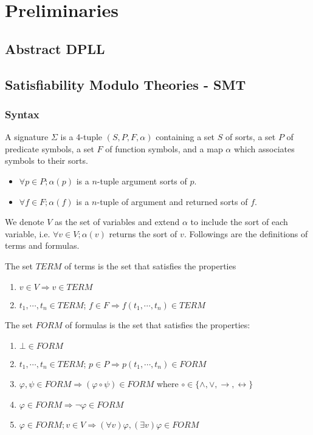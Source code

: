\chapter{Preliminaries}
\section{Abstract DPLL}


\section{Satisfiability Modulo Theories - SMT}
\subsection{Syntax} \label{subsection:smt-syntax}
\begin{definition}
A signature $\Sigma$ is a 4-tuple $(S, P, F, \alpha)$ containing a set $S$ of sorts, a set $P$ of predicate symbols, a set $F$ of function symbols, and a map $\alpha$ which associates symbols to their sorts.
\begin{itemize}
\item $\forall p \in P; \alpha(p)$ is a $n$-tuple argument sorts of $p$.
\item $\forall f \in F; \alpha(f)$ is a $n$-tuple of argument and returned sorts of $f$.
\end{itemize}
\end{definition}


We denote $V$ as the set of variables and extend $\alpha$ to include the sort of each variable, i.e. $\forall v \in V; \alpha(v)$ returns the sort of $v$. Followings are the definitions of terms and formulas.

\begin{definition}
The set $TERM$ of terms is the set that satisfies the properties
\begin{enumerate}
\item $v \in V \Rightarrow v \in TERM$
\item $t_1,\cdots,t_n \in TERM$; $f \in F \Rightarrow f(t_1,\cdots, t_n) \in TERM$
\end{enumerate}
\end{definition}

\begin{definition}
The set $FORM$ of formulas is the set that satisfies the properties:
\begin{enumerate}
\item $\bot \in FORM$
\item $t_1,\cdots,t_n \in TERM$; $p \in P \Rightarrow p(t_1,\cdots, t_n) \in FORM$
\item $\varphi, \psi \in FORM \Rightarrow (\varphi \circ \psi) \in FORM$ where $\circ \in \{\wedge, \vee, \rightarrow, \leftrightarrow\}$
\item $\varphi \in FORM \Rightarrow \neg\varphi \in FORM$
\item $\varphi \in FORM; v \in V \Rightarrow (\forall v)\varphi, (\exists v)\varphi \in FORM$
\end{enumerate}
\end{definition}

